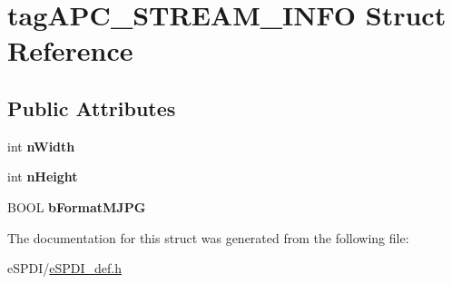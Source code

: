 \hypertarget{structtag_a_p_c___s_t_r_e_a_m___i_n_f_o}{}\section{tag\+A\+P\+C\+\_\+\+S\+T\+R\+E\+A\+M\+\_\+\+I\+N\+FO Struct Reference}
\label{structtag_a_p_c___s_t_r_e_a_m___i_n_f_o}
\subsection*{Public Attributes}
\begin{DoxyCompactItemize}
\item 
\mbox{\label{structtag_a_p_c___s_t_r_e_a_m___i_n_f_o_a41320e6eb0f9d4e8b5b340c434e5fd4b}} 
int {\bfseries n\+Width}
\item 
\mbox{\label{structtag_a_p_c___s_t_r_e_a_m___i_n_f_o_a7a1b8eee8ce4cc0d84776f4078eccc44}} 
int {\bfseries n\+Height}
\item 
\mbox{\label{structtag_a_p_c___s_t_r_e_a_m___i_n_f_o_ace8a4fa4d438fdd6e448f2eff323fee1}} 
B\+O\+OL {\bfseries b\+Format\+M\+J\+PG}
\end{DoxyCompactItemize}


The documentation for this struct was generated from the following file\+:\begin{DoxyCompactItemize}
\item 
e\+S\+P\+D\+I/\hyperlink{e_s_p_d_i__def_8h}{e\+S\+P\+D\+I\+\_\+def.\+h}\end{DoxyCompactItemize}
